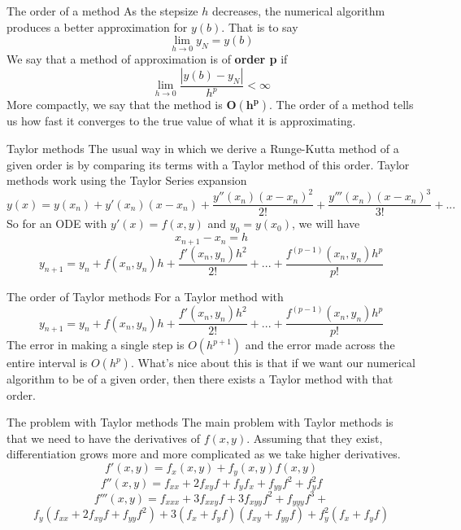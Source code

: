 \documentclass[12pt]{beamer}
\begin{document}
\begin{frame}{The order of a method}
  As the stepsize $h$ decreases, the numerical algorithm produces a better approximation for 
  $y(b)$. \newline
  \newline
  \pause
  That is to say
  $$\lim_{h \to 0} y_N = y(b)$$
  \pause
  We say that a method of approximation is of \textbf{order p} if
  $$\lim_{h \to 0} \frac{|y(b) - y_N|}{h^p} < \infty$$ \pause
  More compactly, we say that the method is $\mathbf{O(h^p)}$. \newline
  \newline
  \pause
  The order of a method tells us how fast it converges to the true value of 
  what it is approximating.
\end{frame}

\begin{frame}{Taylor methods}
  The usual way in which we derive a Runge-Kutta method of a given order is by comparing its   
  terms with a Taylor method of this order.
  \newline
  \newline
  \pause
  Taylor methods work using the Taylor Series expansion
  $$y(x) = y(x_n) + y'(x_n)(x - x_n) + \frac{y''(x_n)(x - x_n)^2}{2!} + \frac{y'''(x_n)(x - x_n)^3}{3!} + ...$$
  \pause
  So for an ODE with $y'(x) = f(x,y)$ and $y_0 = y(x_0)$, we will have
  \pause
  $$x_{n+1} - x_n = h$$
  \pause
  $$y_{n+1} = y_n + f(x_n,y_n)h + \frac{f'(x_n,y_n)h^2}{2!} + ... + \frac{f^{(p-1)}(x_n,y_n)h^p}{p!}$$
\end{frame}

\begin{frame}{The order of Taylor methods}
  For a Taylor method with
  $$y_{n+1} = y_n + f(x_n,y_n)h + \frac{f'(x_n,y_n)h^2}{2!} + ... + \frac{f^{(p-1)}(x_n,y_n)h^p}{p!}$$
  \pause
  The error in making a single step is $O(h^{p+1})$ and the error made across the entire interval 
   is $O(h^p)$. \newline
   \newline
   \pause
   What's nice about this is that if we want our numerical algorithm to be of a given order, then 
   there exists a Taylor method with that order. 
\end{frame}

\begin{frame}{The problem with Taylor methods}
  The main problem with Taylor methods is that we need to have the derivatives of $f(x,y)$.
  Assuming that they exist, differentiation grows more and more complicated as we take higher    
  derivatives.
  \pause
  $$f'(x,y) = f_x(x,y) + f_y(x,y)f(x,y)$$
  \pause
  $$f''(x,y) = f_{xx} + 2f_{xy}f + f_yf_x + f_{yy}f^2 + f_y^2f$$
  \pause
  $$f'''(x,y) = f_{xxx} + 3f_{xxy}f + 3f_{xyy}f^2 + f_{yyy}f^3 + $$
  $$f_y(f_{xx} + 2f_{xy}f + f_{yy}f^2) +  3(f_x + f_yf)(f_{xy} + f_{yy}f) + f_y^2(f_x + f_yf)$$
\end{frame}
\end{document}
